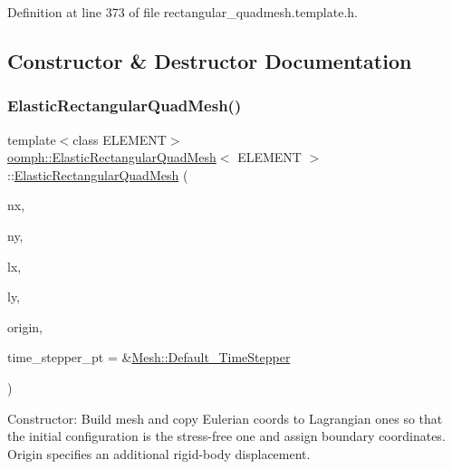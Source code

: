 Definition at line 373 of file rectangular\+\_\+quadmesh.\+template.\+h.



\subsection{Constructor \& Destructor Documentation}
\mbox{\label{classoomph_1_1ElasticRectangularQuadMesh_aad1e395c3f314854b68c4f1df9256230}} 
\subsubsection{\texorpdfstring{Elastic\+Rectangular\+Quad\+Mesh()}{ElasticRectangularQuadMesh()}\hspace{0.1cm}{\footnotesize\ttfamily [1/3]}}
{\footnotesize\ttfamily template$<$class E\+L\+E\+M\+E\+NT$>$ \\
\hyperlink{classoomph_1_1ElasticRectangularQuadMesh}{oomph\+::\+Elastic\+Rectangular\+Quad\+Mesh}$<$ E\+L\+E\+M\+E\+NT $>$\+::\hyperlink{classoomph_1_1ElasticRectangularQuadMesh}{Elastic\+Rectangular\+Quad\+Mesh} (\begin{DoxyParamCaption}\item[{const unsigned \&}]{nx,  }\item[{const unsigned \&}]{ny,  }\item[{const double \&}]{lx,  }\item[{const double \&}]{ly,  }\item[{const \hyperlink{classoomph_1_1Vector}{Vector}$<$ double $>$ \&}]{origin,  }\item[{\hyperlink{classoomph_1_1TimeStepper}{Time\+Stepper} $\ast$}]{time\+\_\+stepper\+\_\+pt = {\ttfamily \&\hyperlink{classoomph_1_1Mesh_a12243d0fee2b1fcee729ee5a4777ea10}{Mesh\+::\+Default\+\_\+\+Time\+Stepper}} }\end{DoxyParamCaption})\hspace{0.3cm}{\ttfamily [inline]}}



Constructor\+: Build mesh and copy Eulerian coords to Lagrangian ones so that the initial configuration is the stress-\/free one and assign boundary coordinates. Origin specifies an additional rigid-\/body displacement. 

